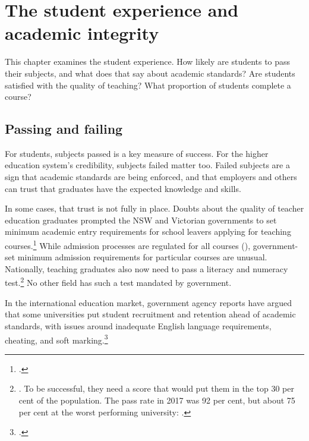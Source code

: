 \documentclass{grattan}
\begin{document}
%
\chapter{The student experience and academic integrity}\label{chap:the-student-experience-and-academic-integrity}

%


This chapter examines the student experience. How likely are students to pass their subjects, and what does that say about academic standards? Are students satisfied with the quality of teaching? What proportion of students complete a course?

%
\section{Passing and failing }\label{sec:passing-and-failing}

For students, subjects passed is a key measure of success. For the higher education system's credibility, subjects failed matter too. Failed subjects are a sign that academic standards are being enforced, and that employers and others can trust that graduates have the expected knowledge and skills.

In some cases, that trust is not fully in place. Doubts about the quality of teacher education graduates prompted the NSW and Victorian governments to set minimum academic entry requirements for school leavers applying for teaching courses.\footcites[][]{DepartmentofEducationandTrainingVictoria2018victorianframework}[][]{NSWEducationStandardsAuthority2018increasedacademic} While admission processes are regulated for all courses (), government-set minimum admission requirements for particular courses are unusual. Nationally, teaching graduates also now need to pass a literacy and numeracy test.\footnote{\textcite[][]{AITSL2015accreditationofin}. To be successful, they need a score that would put them in the top 30 per cent of the population. The pass rate in 2017 was 92 per cent, but about 75 per cent at the worst performing university: \textcite[][]{Urban2018victoriauniversity}.} No other field has such a test mandated by government.

In the international education market, government agency reports have argued that some universities put student recruitment and retention ahead of academic standards, with issues around inadequate English language requirements, cheating, and soft marking.\footcites[][]{ICAC2015learningthehardw}[][]{VictorianOmbudsman2011investigationinto}
\end{document}
